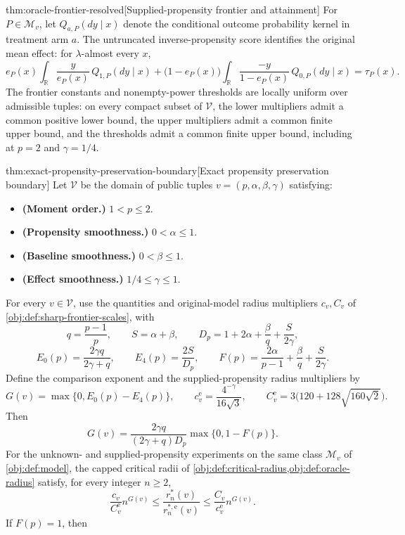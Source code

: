 \documentclass[11pt]{article}
\begin{document}
\begin{theoremv}{thm:oracle-frontier-resolved}[Supplied-propensity frontier and attainment]
For \(P\in\mathcal M_v\), let \(Q_{a,P}(dy\mid x)\) denote the conditional outcome probability kernel in treatment arm \(a\). The untruncated inverse-propensity score identifies the original mean effect: for \(\lambda\)-almost every \(x\),
\[
e_P(x)\int_{\mathbb R}\frac{y}{e_P(x)}\,Q_{1,P}(dy\mid x)
+
\bigl(1-e_P(x)\bigr)
\int_{\mathbb R}\frac{-y}{1-e_P(x)}\,Q_{0,P}(dy\mid x)
=\tau_P(x).
\]
The frontier constants and nonempty-power thresholds are locally uniform over admissible tuples: on every compact subset of \(\mathcal V\), the lower multipliers admit a common positive lower bound, the upper multipliers admit a common finite upper bound, and the thresholds admit a common finite upper bound, including at \(p=2\) and \(\gamma=1/4\).
\end{theoremv}

\begin{theoremv}{thm:exact-propensity-preservation-boundary}[Exact propensity preservation boundary]
Let \(\mathcal V\) be the domain of public tuples \(v=(p,\alpha,\beta,\gamma)\) satisfying:
\begin{itemize}
\item \textbf{(Moment order.)} \(1<p\le2\).
\item \textbf{(Propensity smoothness.)} \(0<\alpha\le1\).
\item \textbf{(Baseline smoothness.)} \(0<\beta\le1\).
\item \textbf{(Effect smoothness.)} \(1/4\le\gamma\le1\).
\end{itemize}
For every \(v\in\mathcal V\), use the quantities and original-model radius multipliers \(c_v,C_v\) of \cref{obj:def:sharp-frontier-scales}, with
\[
q=\frac{p-1}{p},\qquad S=\alpha+\beta,\qquad
D_p=1+2\alpha+\frac{\beta}{q}+\frac{S}{2\gamma},
\]
\[
E_0(p)=\frac{2\gamma q}{2\gamma+q},\qquad
E_4(p)=\frac{2S}{D_p},\qquad
F(p)=\frac{2\alpha}{p-1}+\frac{\beta}{q}+\frac{S}{2\gamma}.
\]
Define the comparison exponent and the supplied-propensity radius multipliers by
\[
G(v)=\max\{0,E_0(p)-E_4(p)\},\qquad
c^{\mathrm e}_v=\frac{4^{-\gamma}}{16\sqrt3},\qquad
C^{\mathrm e}_v=3\bigl(120+128\sqrt{160\sqrt2}\bigr).
\]
Then
\[
G(v)=
\frac{2\gamma q}{(2\gamma+q)D_p}\max\{0,1-F(p)\}.
\]
For the unknown- and supplied-propensity experiments on the same class \(\mathcal M_v\) of \cref{obj:def:model}, the capped critical radii of \cref{obj:def:critical-radius,obj:def:oracle-radius} satisfy, for every integer \(n\ge2\),
\[
\frac{c_v}{C^{\mathrm e}_v}n^{G(v)}
\le
\frac{r_n^*(v)}{r_n^{*,\mathrm e}(v)}
\le
\frac{C_v}{c^{\mathrm e}_v}n^{G(v)}.
\]
If \(F(p)=1\), then

\end{theoremv}
\end{document}

